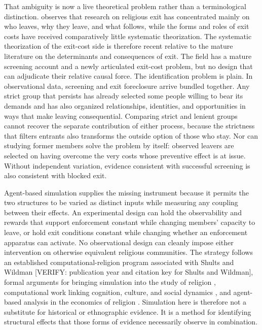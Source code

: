 \documentclass[12pt]{article}
\begin{document}
That ambiguity is now a live theoretical problem rather than a terminological distinction. \citet{bok2025} observes that research on religious exit has concentrated mainly on who leaves, why they leave, and what follows, while the forms and roles of exit costs have received comparatively little systematic theorization. The systematic theorization of the exit-cost side is therefore recent relative to the mature literature on the determinants and consequences of exit. The field has a mature screening account and a newly articulated exit-cost problem, but no design that can adjudicate their relative causal force. The identification problem is plain. In observational data, screening and exit foreclosure arrive bundled together. Any strict group that persists has already selected some people willing to bear its demands and has also organized relationships, identities, and opportunities in ways that make leaving consequential. Comparing strict and lenient groups cannot recover the separate contribution of either process, because the strictness that filters entrants also transforms the outside option of those who stay. Nor can studying former members solve the problem by itself: observed leavers are selected on having overcome the very costs whose preventive effect is at issue. Without independent variation, evidence consistent with successful screening is also consistent with blocked exit.

Agent-based simulation supplies the missing instrument because it permits the two structures to be varied as distinct inputs while measuring any coupling between their effects. An experimental design can hold the observability and rewards that support enforcement constant while changing members' capacity to leave, or hold exit conditions constant while changing whether an enforcement apparatus can activate. No observational design can cleanly impose either intervention on otherwise equivalent religious communities. The strategy follows an established computational-religion program associated with Shults and Wildman [VERIFY: publication year and citation key for Shults and Wildman], formal arguments for bringing simulation into the study of religion \citep{wildmansosis2011}, computational work linking cognition, culture, and social dynamics \citep{gorelemosshultswildman2018}, and agent-based analysis in the economics of religion \citep{iannacconemakowsky2007}. Simulation here is therefore not a substitute for historical or ethnographic evidence. It is a method for identifying structural effects that those forms of evidence necessarily observe in combination.
\end{document}
